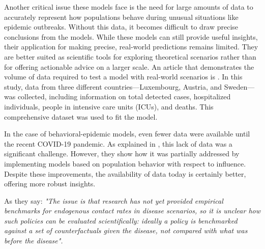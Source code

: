 Another critical issue these models face is the need for large amounts of data to accurately represent how populations behave during unusual situations like epidemic outbreaks. Without this data, it becomes difficult to draw precise conclusions from the models. While these models can still provide useful insights, their application for making precise, real-world predictions remains limited. They are better suited as scientific tools for exploring theoretical scenarios rather than for offering actionable advice on a larger scale. An article that demonstrates the volume of data required to test a model with real-world scenarios is \cite{Kemp_2021}. In this study, data from three different countries—Luxembourg, Austria, and Sweden—was collected, including information on total detected cases, hospitalized individuals, people in intensive care units (ICUs), and deaths. This comprehensive dataset was used to fit the model.

In the case of behavioral-epidemic models, even fewer data were available until the recent COVID-19 pandemic. As explained in \cite{Gosak2021}, this lack of data was a significant challenge. However, they show how it was partially addressed by implementing models based on population behavior with respect to influence. Despite these improvements, the availability of data today is certainly better, offering more robust insights. 

As they say: \textit{"The issue is that research has not yet provided empirical benchmarks for endogenous contact rates in disease scenarios, so it is unclear how such policies can be evaluated scientifically: ideally a policy is benchmarked against a set of counterfactuals given the disease, not compared with what was before the disease".}

